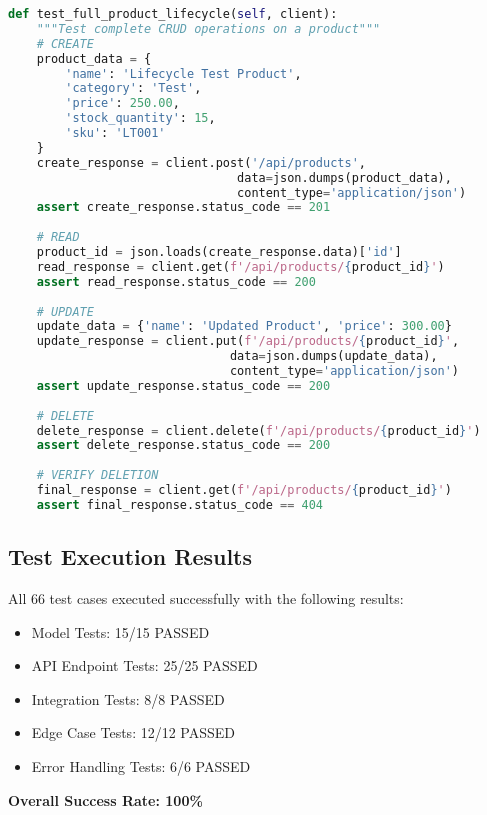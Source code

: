 \documentclass[12pt,a4paper]{article}
\begin{document}
\begin{lstlisting}[language=Python, caption=Full CRUD Lifecycle Testing]
def test_full_product_lifecycle(self, client):
    """Test complete CRUD operations on a product"""
    # CREATE
    product_data = {
        'name': 'Lifecycle Test Product',
        'category': 'Test',
        'price': 250.00,
        'stock_quantity': 15,
        'sku': 'LT001'
    }
    create_response = client.post('/api/products',
                                data=json.dumps(product_data),
                                content_type='application/json')
    assert create_response.status_code == 201
    
    # READ
    product_id = json.loads(create_response.data)['id']
    read_response = client.get(f'/api/products/{product_id}')
    assert read_response.status_code == 200
    
    # UPDATE
    update_data = {'name': 'Updated Product', 'price': 300.00}
    update_response = client.put(f'/api/products/{product_id}',
                               data=json.dumps(update_data),
                               content_type='application/json')
    assert update_response.status_code == 200
    
    # DELETE
    delete_response = client.delete(f'/api/products/{product_id}')
    assert delete_response.status_code == 200
    
    # VERIFY DELETION
    final_response = client.get(f'/api/products/{product_id}')
    assert final_response.status_code == 404
\end{lstlisting}

\subsection{Test Execution Results}

\begin{successbox}
All 66 test cases executed successfully with the following results:
\begin{itemize}
    \item Model Tests: 15/15 PASSED
    \item API Endpoint Tests: 25/25 PASSED  
    \item Integration Tests: 8/8 PASSED
    \item Edge Case Tests: 12/12 PASSED
    \item Error Handling Tests: 6/6 PASSED
\end{itemize}
\textbf{Overall Success Rate: 100\%}
\end{successbox}
\end{document}
